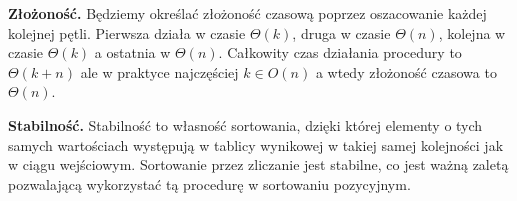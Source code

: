 \textbf{Złożoność.} 
Będziemy określać złożoność czasową poprzez oszacowanie każdej kolejnej pętli.
Pierwsza działa w czasie $\Theta(k)$, druga w czasie $\Theta(n)$, kolejna w czasie $\Theta(k)$ a ostatnia w $\Theta(n)$.
Całkowity czas działania procedury to $\Theta(k+n)$ ale w praktyce najczęściej $k \in O(n)$ a wtedy złożoność czasowa to \textbf{$\Theta(n)$}.

\textbf{Stabilność.} 
Stabilność to własność sortowania, dzięki której elementy o tych samych wartościach występują w tablicy wynikowej w takiej samej kolejności jak w ciągu wejściowym.
Sortowanie przez zliczanie jest stabilne, co jest ważną zaletą pozwalającą wykorzystać tą procedurę w sortowaniu pozycyjnym.

